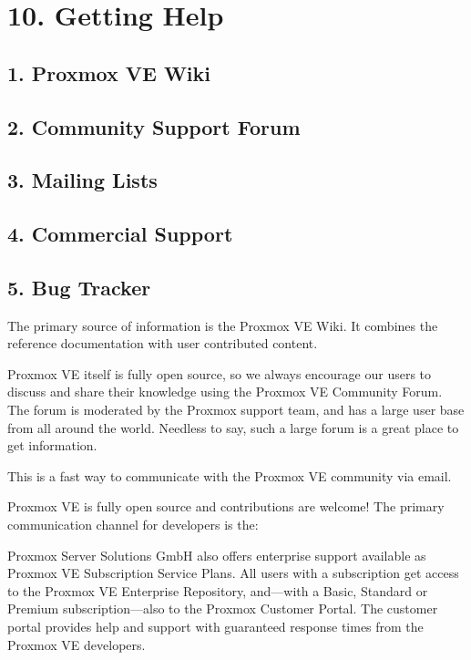 \section{10. Getting Help}

\subsection{1. Proxmox VE Wiki}

\subsection{2. Community Support Forum}

\subsection{3. Mailing Lists}

\subsection{4. Commercial Support}

\subsection{5. Bug Tracker}

The primary source of information is the Proxmox VE Wiki. It combines the reference documentation with user contributed content.

Proxmox VE itself is fully open source, so we always encourage our users to discuss and share their knowledge using the Proxmox VE Community Forum. The forum is moderated by the Proxmox support team, and has a large user base from all around the world. Needless to say, such a large forum is a great place to get information.

This is a fast way to communicate with the Proxmox VE community via email.

Proxmox VE is fully open source and contributions are welcome! The primary communication channel for developers is the:

Proxmox Server Solutions GmbH also offers enterprise support available as Proxmox VE Subscription Service Plans. All users with a subscription get access to the Proxmox VE Enterprise Repository, and—with a Basic, Standard or Premium subscription—also to the Proxmox Customer Portal. The customer portal provides help and support with guaranteed response times from the Proxmox VE developers.

